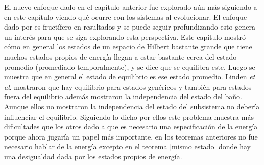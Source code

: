 El nuevo enfoque dado en el capítulo anterior fue explorado aún más siguiendo a \cite{LindenPaper} en este capítulo viendo qué ocurre con los sistemas al evolucionar. El enfoque dado por \cite{Popescu2006} es fructífero  en resultados y se puede seguir profundizando esto genera un interés para que se siga explorando esta perspectiva. Este capítulo mostró cómo en general los estados de un espacio de Hilbert bastante grande que tiene muchos estados propios de energía llegan a estar bastante cerca del estado promedio (promediado temporalmente), y se dice que se equilibra este. Luego se muestra que en general el estado de equilibrio es ese estado promedio. Linden \textit{et al}. mostraron que hay equilibrio para estados genéricos y también para estados fuera del equilibrio además mostraron la independencia del estado del baño. Aunque ellos no mostraron la independencia del estado del subsistema no debería influenciar el equilibrio. Siguiendo lo dicho por ellos este problema muestra más dificultades que los otros dado a que es necesario una especificación de la energía porque ahora jugaría un papel más importante, en los teoremas anteriores no fue necesario hablar de la energía excepto en el teorema \ref{mismo estado} donde hay una desigualdad dada por los estados propios de energía. 

